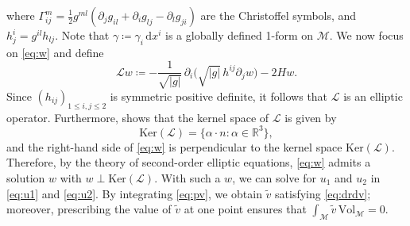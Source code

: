 \documentclass[11pt,a4paper,oneside,reqno]{amsart}
\theoremstyle{definition}
\theoremstyle{plain}
\numberwithin{theorem}{section}
\numberwithin{proposition}{section}
\numberwithin{lemma}{section}
\numberwithin{equation}{section}
\newcommand{\Ker}{\text{Ker}}
\newcommand{\Man}{\mathcal{M}}
\newcommand{\Vol}{\mathrm{Vol}}
\begin{document}
where \( \Gamma_{ij}^m = \frac{1}{2} g^{ml} ( \partial_j g_{il} + \partial_i g_{lj} - \partial_l g_{ji} ) \) are the Christoffel symbols, and \( h^i_j = g^{il} h_{lj} \). 
Note that \(\gamma\coloneqq \gamma_i \, \mathrm{d}x^i \) is a globally defined 1-form on \( \Man \). 
We now focus on \eqref{eq:w} and define
\[
\mathcal{L} w \coloneqq -\frac{1}{\sqrt{|g|}} \, \partial_i \bigl( \sqrt{|g|} \, h^{ij} \partial_j w \bigr) - 2 H w.
\]
Since \( (h_{ij})_{1 \leq i,j \leq 2} \) is symmetric positive definite, it follows that \( \mathcal{L} \) is an elliptic operator.
Furthermore, \cite[pp. 173-174]{han2006isometric} shows that the kernel space of \( \mathcal{L} \) is given by
\[
\Ker(\mathcal{L}) = \{ \alpha \cdot n : \alpha \in \mathbb{R}^3 \},
\]
and the right-hand side of \eqref{eq:w} is perpendicular to the kernel space \( \Ker(\mathcal{L}) \).
Therefore, by the theory of second-order elliptic equations, \eqref{eq:w} admits a solution \( w \) with \( w \perp \Ker(\mathcal{L}) \).
With such a \( w \), we can solve for \( u_1 \) and \( u_2 \) in \eqref{eq:u1} and \eqref{eq:u2}.
By integrating \eqref{eq:pv}, we obtain \( \tilde v \) satisfying \eqref{eq:drdv}; moreover, prescribing the value of \( \tilde v \) at one point ensures that \( \int_{\Man} \tilde v \, \Vol_{\Man} = 0 \).
\end{document}
